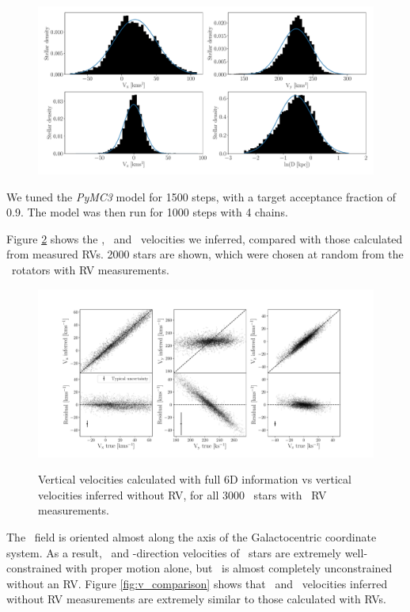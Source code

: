 \begin{figure}[ht!]
\caption{
    }
  \centering
    \includegraphics[width=1\textwidth]{prior_distributions}
\label{fig:prior_distributions}
\end{figure}

We tuned the {\it PyMC3} model for 1500 steps, with a target acceptance
fraction of 0.9.
The model was then run for 1000 steps with 4 chains.

Figure \ref{fig:residuals} shows the \vx, \vy\ and \vz\ velocities we
inferred, compared with those calculated from measured RVs.
2000 stars are shown, which were chosen at random from the \kepler\ rotators
with RV measurements.
\begin{figure}[ht!]
\caption{Vertical velocities calculated with full 6D information vs vertical
    velocities inferred without RV, for all 3000 \mct\ stars with \gaia\ RV
    measurements.}
  \centering
    \includegraphics[width=1\textwidth]{residuals}
\label{fig:residuals}
\end{figure}
The \kepler\ field is oriented almost along the \y\-axis of the Galactocentric
coordinate system.
As a result, \x\ and \z-direction velocities of \kepler\ stars are extremely
well-constrained with proper motion alone, but \vy\ is almost completely
unconstrained without an RV.
Figure \ref{fig:v_comparison} shows that \vx\ and \vz\ velocities inferred
without RV measurements are extremely similar to those calculated with RVs.

